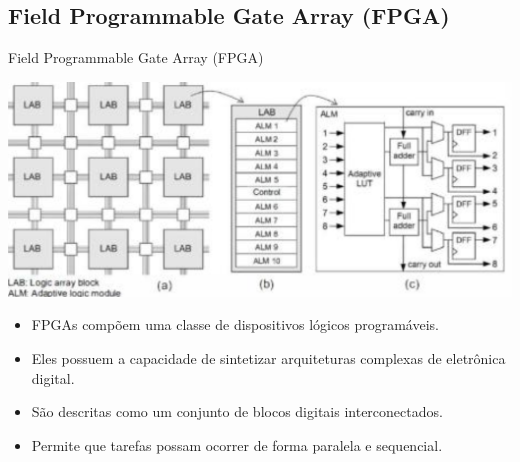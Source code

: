 \documentclass{if-beamer}
\begin{document}
\subsection{Field Programmable Gate Array (FPGA)}
\begin{frame}{Field Programmable Gate Array (FPGA)}
	\begin{minipage}{0.5\textwidth}
	
			\includegraphics[scale=0.25]{FPGA Stratix X da Intel.png}
		
	\end{minipage}%
	\hspace{0.04\textwidth}
	\begin{minipage}{0.5\textwidth}
		\begin{itemize}
			\item FPGAs compõem uma classe de dispositivos lógicos programáveis.
			\item Eles possuem a capacidade de sintetizar arquiteturas complexas de eletrônica digital.
			\item São descritas como um conjunto de blocos digitais interconectados.
			\item Permite que tarefas possam ocorrer de forma paralela e sequencial.
			
		\end{itemize}
	\end{minipage}
\end{frame}
\end{document}
